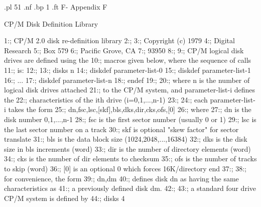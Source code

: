 .pl 51
.nf
.bp 1
.ft                                                       F-%
                                        Appendix F

                               CP/M Disk Definition Library


  1:;                       CP/M 2.0 disk re-definition library
  2:;
  3:;                       Copyright (c) 1979
  4:;                       Digital Research
  5:;                       Box 579
  6:;                       Pacific Grove, CA
  7:;                       93950
  8:;
  9:;                       CP/M logical disk drives are defined using the
 10:;                       macros given below, where the sequence of calls
 11:;                       is:
 12:;
 13:;                       disks n
 14:;                       diskdef parameter-list-0
 15:;                       diskdef parameter-list-1
 16:;                       ...
 17:;                       diskdef parameter-list-n
 18:;                       endef
 19:;
 20:;                       where n is the number of logical disk drives attached
 21:;                       to the CP/M system, and parameter-list-i defines the
 22:;                       characteristics of the ith drive (i=0,1,...,n-1)
 23:;
 24:;                       each parameter-list-i takes the form
 25:;                                dn,fsc,lsc,[skf],bls,dks,dir,cks,ofs,[0]
 26:;                       where
 27:;                       dn       is the disk number 0,1,...,n-1
 28:;                       fsc      is the first sector number (usually 0 or 1)
 29:;                       lsc      is the last sector number on a track
 30:;                       skf      is optional "skew factor" for sector translate
 31:;                       bls      is the data block size (1024,2048,...,16384)
 32:;                       dks      is the disk size in bls increments (word)
 33:;                       dir      is the number of directory elements (word)
 34:;                       cks      is the number of dir elements to checksum
 35:;                       ofs      is the number of tracks to skip (word)
 36:;                       [0]      is an optional 0 which forces 16K/directory end
 37:;
 38:;                       for convenience, the form
 39:;                                dn,dm
 40:;                       defines disk dn as having the same characteristics as
 41:;                       a previously defined disk dm.
 42:;
 43:;                       a standard four drive CP/M system is defined by
 44:;                                disks               4
